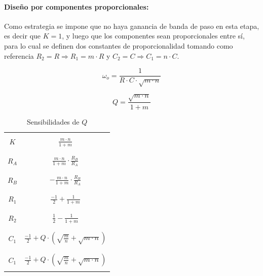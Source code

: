 \paragraph{Dise\~no por componentes proporcionales:} Como estrategia se impone que no haya ganancia de banda de paso en esta etapa, es decir que $K = 1$, y luego que los componentes sean proporcionales
entre s\'i, para lo cual se definen dos constantes de proporcionalidad tomando como referencia $R_2 = R \Rightarrow R_1 = m \cdot R$ y $C_2 = C \Rightarrow C_1 = n \cdot C$.

\begin{equation}
\omega_o = \frac{1}{R \cdot C \cdot \sqrt{m \cdot n}}
\label{eq:wo_ajuste_componentes_propocionales}
\end{equation}

\begin{equation}
Q = \frac{\sqrt{m \cdot n}}{1 + m}
\label{eq:q_ajuste_componentes_proporcionales}
\end{equation}


\begin{table}[H]
	\centering
	\begin{tabular}{c | c}
		\hline \\
		$K$ & $\frac{m \cdot n}{1 + m}$ \\
		\\ \hline \\
		$R_A$ & $\frac{m \cdot n}{1 + m} \cdot \frac{R_B}{R_A}$ \\
		\\ \hline \\
		$R_B$ & $- \frac{m \cdot n}{1 + m} \cdot \frac{R_B}{R_A}$ \\
		\\ \hline \\
		$R_1$ & $\frac{-1}{2} + \frac{1}{1 + m}$ \\
		\\ \hline \\
		$R_2$ & $\frac{1}{2} - \frac{1}{1 + m}$ \\
		\\ \hline \\
		$C_1$ & $\frac{-1}{2} + Q \cdot \left( \sqrt{\frac{m}{n}} + \sqrt{m \cdot n} \right)$ \\
		\\ \hline \\
		$C_1$ & $\frac{-1}{2} + Q \cdot \left( \sqrt{\frac{m}{n}} + \sqrt{m \cdot n} \right)$ \\
		\\ \hline
	\end{tabular}
	\caption{Sensibilidades de $Q$}
\end{table}

